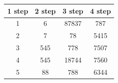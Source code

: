 \documentclass{article}
\begin{document}
\begin{multicols}{2}
    \begin{center}
        \begin{tabular}{||c c c c||}
            \hline
            1 step & 2 step & 3 step & 4 step \\ [0.5ex]
            \hline\hline
            1      & 6      & 87837  & 787    \\
            \hline
            2      & 7      & 78     & 5415   \\
            \hline
            3      & 545    & 778    & 7507   \\
            \hline
            4      & 545    & 18744  & 7560   \\
            \hline
            5      & 88     & 788    & 6344   \\ [1ex]
            \hline
        \end{tabular}
    \end{center}


    \subsection*{}
\end{multicols}
\end{document}
